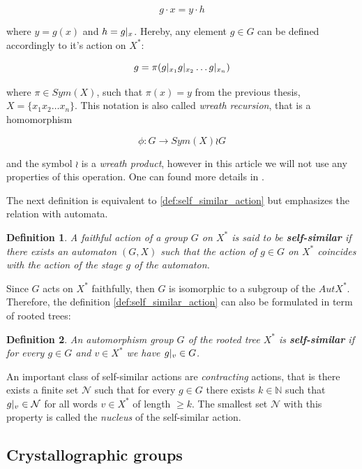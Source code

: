 \documentclass[a4paper,12pt]{amsart}
\newtheorem{definition}{Definition}
\begin{document}
	$$g \cdot x = y \cdot h$$
	
	where $y = g(x)$ and $h = g\arrowvert_x$. Hereby, any element $g \in G$ can be defined accordingly to it's action on $X^*$: 
	
	$$g = \pi (g\arrowvert_{x_1} g\arrowvert_{x_2} \dots g\arrowvert_{x_n})$$
	
	where $\pi \in Sym(X)$, such that $\pi(x) = y$ from the previous thesis, $X = \{x_1 x_2 \dots x_n\}$. This notation is also called \textit{wreath recursion}, that is a homomorphism 
	
	$$\phi : G \rightarrow Sym(X) \wr G$$
	
	and the symbol $\wr$ is a \textit{wreath product}, however in this article we will not use any properties of this operation. One can found more details in \cite{Nekrashevych}.
	
	
	
	
	The next definition is equivalent to \ref{def:self_similar_action} but emphasizes the relation with automata. 
	
	\begin{definition}
		A faithful action of a group $G$ on $X^*$ is said to be \textbf{self-similar} if there exists an automaton $(G, X)$ such that the action of $g \in G$ on $X^*$ coincides with the action of the stage $g$ of the automaton. 
	\end{definition} 

	Since $G$ acts on $X^*$ faithfully, then $G$ is isomorphic to a subgroup of the $Aut X^*$. Therefore, the definition \ref{def:self_similar_action} can also be formulated in term of rooted trees: 
	
	\begin{definition}
		An automorphism group $G$ of the rooted tree $X^*$ is \textbf{self-similar} if for every $g \in G$ and $v \in X^*$ we have $g\arrowvert_v \in G$.
	\end{definition} 
	
	
	An important class of self-similar actions are \textit{contracting} actions, that is there exists a finite set $\mathcal{N}$ such that for every $g \in G$ there exists $k \in \mathbb{N}$ such that $g\arrowvert_v \in \mathcal{N}$ for all words $v \in X^*$ of length $\ge k$. The smallest set $\mathcal{N}$ with this property is called the \textit{nucleus} of the self-similar action. 
	
	\subsection{Crystallographic groups}
	
\end{document}
